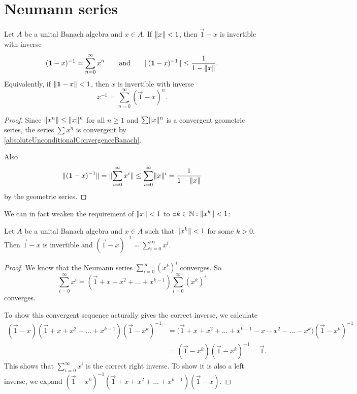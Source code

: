 \section{Neumann series}
\begin{proposition} \label{NeumannSeries}
Let $A$ be a unital Banach algebra and $x\in A$. 
If $\lVert x\rVert<1$, then $\vec{1}-x$ is invertible with inverse
\[ (\boldsymbol{\mathrm{1}}-x)^{-1} = \sum_{n=0}^\infty x^n \qquad\text{and}\qquad \lVert(\boldsymbol{\mathrm{1}} - x)^{-1}\rVert \leq \frac{1}{1-\lVert x\rVert}. \]
Equivalently, if $\lVert\boldsymbol{\mathrm{1}}-x\rVert< 1$, then $x$ is invertible with inverse
\[ x^{-1} = \sum_{n=0}^\infty(\vec{1}-x)^n. \]
\end{proposition}
\begin{proof}
Since $\lVert x^n\rVert\leq \lVert x\rVert^n$ for all $n\geq 1$ and $\sum \lVert x\rVert^n$ is a convergent geometric series, the series $\sum x^n$ is convergent by \ref{absoluteUnconditionalConvergenceBanach}.

Also
\[ \lVert(\boldsymbol{\mathrm{1}} - x)^{-1}\rVert = \lVert\sum_{i=0}^\infty x^i\rVert \leq \sum_{i=0}^\infty \lVert x\rVert^i = \frac{1}{1-\lVert x\rVert} \]
by the geometric series.
\end{proof}
We can in fact weaken the requirement of $\lVert x\rVert<1$ to $\exists k\in\mathbb{N}: \lVert x^k\rVert<1$:
\begin{corollary} \label{NeumannSeriesEventuallyContractive}
Let $A$ be a unital Banach algebra and $x\in A$ such that $\lVert x^k\rVert<1$ for some $k>0$. Then $\vec{1} - x$ is invertible and $(\vec{1} - x)^{-1} = \sum_{i=0}^\infty x^i$.
\end{corollary}
\begin{proof}
We know that the Neumann series $\sum_{i=0}^\infty(x^k)^i$ converges. So
\[ \sum_{i=0}^\infty x^i = (\vec{1} + x + x^2 +\ldots + x^{k-1})\sum_{i=0}^\infty(x^k)^i \]
converges.

To show this convergent sequence acturally gives the correct inverse, we calculate
\begin{align*}
(\vec{1}-x)(\vec{1} + x + x^2 +\ldots + x^{k-1})(\vec{1} - x^k)^{-1} &= \Big(\vec{1} + x + x^2 +\ldots + x^{k-1} - x - x^2 -\ldots - x^{k}\Big)(\vec{1} - x^k)^{-1} \\
&= (\vec{1} - x^k)(\vec{1} - x^k)^{-1} = \vec{1}.
\end{align*}
This shows that $\sum_{i=0}^\infty x^i$ is the correct right inverse. To show it is also a left inverse, we expand $(\vec{1} - x^k)^{-1}(\vec{1} + x + x^2 +\ldots + x^{k-1})(\vec{1}-x)$.
\end{proof}


